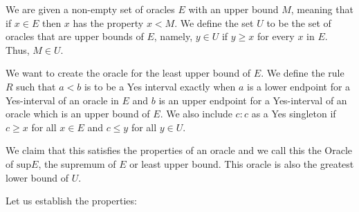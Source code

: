 \documentclass[12pt]{article}
\begin{document}
We are given a non-empty set of oracles $E$ with an upper bound $M$, meaning that if $x \in E$ then $x$ has the property $x < M$. We define the set $U$ to be the set of oracles that are upper bounds of $E$, namely, $y \in U$ if $y \geq x$ for every $x$ in $E$.  Thus, $M \in U$.

We want to create the oracle for the least upper bound of $E$. We define the rule $R$ such that $a\lt b$ is to be a Yes interval exactly when $a$ is a lower endpoint for a Yes-interval of an oracle in $E$ and $b$ is an upper endpoint for a Yes-interval of an oracle which is an upper bound of $E$. We also include $c:c$ as a Yes singleton if $c \geq x$ for all $x \in E$ and $c \leq y$ for all $y\in U$.

We claim that this satisfies the properties of an oracle and we call this the Oracle of $\mathrm{sup} E$, the supremum of $E$ or least upper bound. This oracle is also the greatest lower bound of $U$.

Let us establish the properties: 
\end{document}
